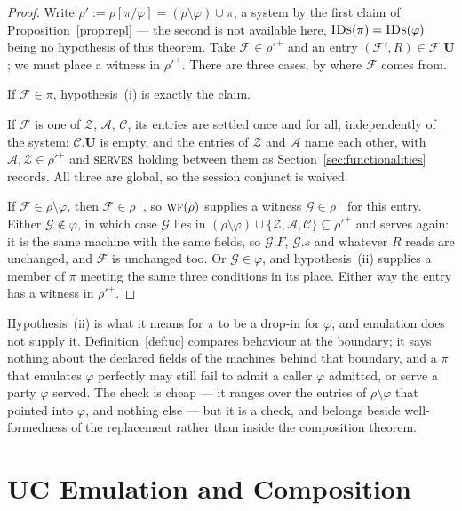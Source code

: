 \documentclass[11pt,a4paper]{article}
\newcommand{\uses}{\mathbf{U}}
\newcommand{\serves}{\op{serves}}
\newcommand{\WF}{\op{wf}}
\newcommand{\Corr}{\mathcal{C}}
\newcommand{\F}{\mathcal{F}}
\newcommand{\G}{\mathcal{G}}
\newcommand{\Zenv}{\mathcal{Z}}
\newcommand{\Adv}{\mathcal{A}}
\newcommand{\op}[1]{\textsc{#1}}
\newcommand{\IDs}{\op{IDs}}
\theoremstyle{accentdef}
\theoremstyle{accentplain}
\begin{document}
\begin{proof}
Write $\rho' := \rho[\pi/\varphi] = (\rho \setminus \varphi) \cup \pi$, a system by the first
claim of Proposition~\ref{prop:repl} --- the second is not available here, $\IDs(\pi) = \IDs(\varphi)$
being no hypothesis of this theorem. Take $\F \in \rho'^{+}$ and an entry $(\F',R) \in \F.\uses$; we must
place a witness in $\rho'^{+}$. There are three cases, by where $\F$ comes from.

If $\F \in \pi$, hypothesis~(i) is exactly the claim.

If $\F$ is one of $\Zenv$, $\Adv$, $\Corr$, its entries are settled once and for all,
independently of the system: $\Corr.\uses$ is empty, and the entries of $\Zenv$ and $\Adv$ name
each other, with $\Adv, \Zenv \in \rho'^{+}$ and $\serves$ holding between them as
Section~\ref{sec:functionalities} records. All three are global, so the session conjunct is waived.

If $\F \in \rho \setminus \varphi$, then $\F \in \rho^{+}$, so $\WF(\rho)$ supplies a witness
$\G \in \rho^{+}$ for this entry. Either $\G \notin \varphi$, in which case $\G$ lies in
$(\rho \setminus \varphi) \cup \{\Zenv,\Adv,\Corr\} \subseteq \rho'^{+}$ and serves again: it is
the same machine with the same fields, so $\G.F$, $\G.s$ and whatever $R$ reads are unchanged, and
$\F$ is unchanged too. Or $\G \in \varphi$, and hypothesis~(ii) supplies a member of $\pi$ meeting
the same three conditions in its place. Either way the entry has a witness in $\rho'^{+}$.
\end{proof}

Hypothesis~(ii) is what it means for $\pi$ to be a drop-in for $\varphi$, and emulation does not
supply it. Definition~\ref{def:uc} compares behaviour at the boundary; it says nothing about the
declared fields of the machines behind that boundary, and a $\pi$ that emulates $\varphi$
perfectly may still fail to admit a caller $\varphi$ admitted, or serve a party $\varphi$ served.
The check is cheap --- it ranges over the entries of $\rho \setminus \varphi$ that pointed into
$\varphi$, and nothing else --- but it is a check, and belongs beside well-formedness of the
replacement rather than inside the composition theorem.

\section{UC Emulation and Composition}\label{sec:uc}
\end{document}
